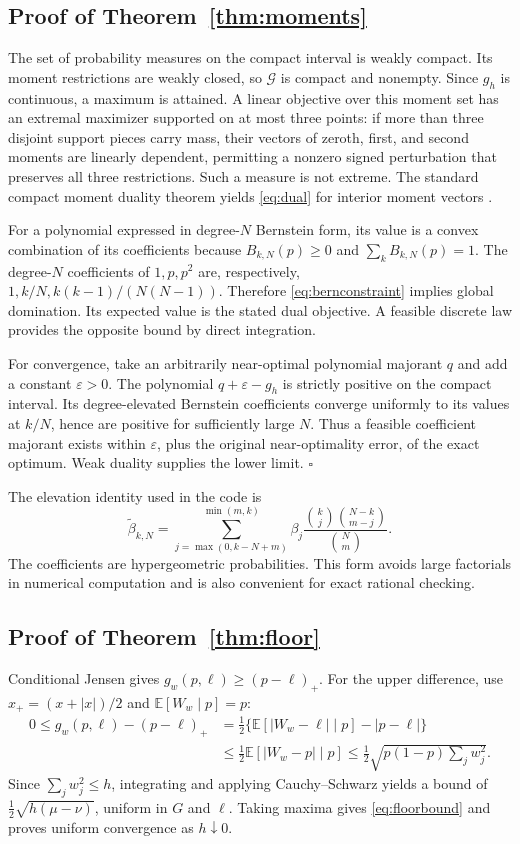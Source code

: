\documentclass[11pt]{article}
\theoremstyle{definition}\newtheorem{definition}[theorem]{Definition}
\newcommand{\E}{\mathbb E}
\newcommand{\G}{\mathcal G}
\newcommand{\pos}[1]{\left(#1\right)_+}
\begin{document}
\subsection{Proof of Theorem~\ref{thm:moments}}
The set of probability measures on the compact interval is weakly compact. Its moment restrictions are weakly closed, so \(\G\) is compact and nonempty. Since \(g_h\) is continuous, a maximum is attained. A linear objective over this moment set has an extremal maximizer supported on at most three points: if more than three disjoint support pieces carry mass, their vectors of zeroth, first, and second moments are linearly dependent, permitting a nonzero signed perturbation that preserves all three restrictions. Such a measure is not extreme. The standard compact moment duality theorem yields \eqref{eq:dual} for interior moment vectors \citep{bertsimas2005}.

For a polynomial expressed in degree-\(N\) Bernstein form, its value is a convex combination of its coefficients because \(B_{k,N}(p)\geq0\) and \(\sum_kB_{k,N}(p)=1\). The degree-\(N\) coefficients of \(1,p,p^2\) are, respectively, \(1,k/N,k(k-1)/(N(N-1))\). Therefore \eqref{eq:bernconstraint} implies global domination. Its expected value is the stated dual objective. A feasible discrete law provides the opposite bound by direct integration.

For convergence, take an arbitrarily near-optimal polynomial majorant \(q\) and add a constant \(\varepsilon>0\). The polynomial \(q+\varepsilon-g_h\) is strictly positive on the compact interval. Its degree-elevated Bernstein coefficients converge uniformly to its values at \(k/N\), hence are positive for sufficiently large \(N\). Thus a feasible coefficient majorant exists within \(\varepsilon\), plus the original near-optimality error, of the exact optimum. Weak duality supplies the lower limit. \hfill\(\square\)

The elevation identity used in the code is
\begin{equation}
 \widetilde\beta_{k,N}=\sum_{j=\max(0,k-N+m)}^{\min(m,k)}
 \beta_j\frac{\binom{k}{j}\binom{N-k}{m-j}}{\binom{N}{m}}.
 \label{eq:elevation}
\end{equation}
The coefficients are hypergeometric probabilities. This form avoids large factorials in numerical computation and is also convenient for exact rational checking.

\subsection{Proof of Theorem~\ref{thm:floor}}
Conditional Jensen gives \(g_w(p,\ell)\geq\pos{p-\ell}\). For the upper difference, use \(x_+=(x+|x|)/2\) and \(\E[W_w\mid p]=p\):
\begin{align*}
0\leq g_w(p,\ell)-\pos{p-\ell}
&=\tfrac12\{\E[|W_w-\ell|\mid p]-|p-\ell|\}\\
&\leq\tfrac12\E[|W_w-p|\mid p]
\leq\tfrac12\sqrt{p(1-p)\sum_jw_j^2}.
\end{align*}
Since \(\sum_jw_j^2\leq h\), integrating and applying Cauchy--Schwarz yields a bound of \(\tfrac12\sqrt{h(\mu-\nu)}\), uniform in \(G\) and \(\ell\). Taking maxima gives \eqref{eq:floorbound} and proves uniform convergence as \(h\downarrow0\).
\end{document}

